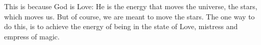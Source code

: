 This is because God is Love: He is the energy that moves the universe, the stars, which moves us. But of course, we are meant to move the stars. The one way to do this, is to achieve the energy of being in the state of Love, mistress and empress of magic.


